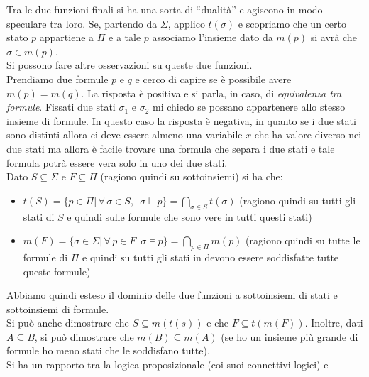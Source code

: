 				      				Tra le due funzioni finali si ha una sorta di ``dualità'' e agiscono in modo
				      				speculare tra loro. Se, partendo da $\Sigma$, applico $t(\sigma)$ e scopriamo
				      				che un certo stato $p$ appartiene a $\Pi$ e a tale $p$ associamo l'insieme dato
				      				da $m(p)$ si avrà che $\sigma\in m(p)$.\\
				      				Si possono fare altre osservazioni su queste due funzioni. \\
				      				Prendiamo due formule $p$ e $q$ e cerco di capire se è possibile avere
				      				$m(p)=m(q)$. La risposta è positiva e si parla, in caso, di \textit{equivalenza
				      					tra formule}. Fissati due stati $\sigma_1$ e $\sigma_2$ mi chiedo se possano
				      				appartenere allo stesso insieme di formule. In questo caso la risposta è
				      				negativa, in quanto se i due stati sono distinti allora ci deve essere almeno
				      				una variabile $x$ che ha valore diverso nei due stati ma allora è facile trovare
				      				una formula che separa i due stati e tale formula potrà essere vera solo in uno
				      				dei due stati.\\
				      				Dato $S\subseteq \Sigma$ e $F\subseteq\Pi$ (ragiono quindi su sottoinsiemi) si
				      				ha che:
				      				\begin{itemize}
				      					\item $t(S)=\{p\in \Pi|\,\forall\,\sigma\in S,\,\,\,\sigma\vDash
				      					      p\}=\bigcap_{\sigma\in S}t(\sigma)$ (ragiono quindi su tutti gli stati di $S$
				      					      e quindi sulle formule che sono vere in tutti questi stati) 
				      					\item $m(F)=\{\sigma\in \Sigma|\,\forall\,p\in F\,\,\,\sigma\vDash
				      					      p\}=\bigcap_{p\in \Pi}m(p)$ (ragiono quindi su tutte le formule di $\Pi$
				      					      e quindi su tutti gli stati in devono essere soddisfatte tutte queste formule) 
				      				\end{itemize}
				      				Abbiamo quindi esteso il dominio delle due funzioni a sottoinsiemi di stati e
				      				sottoinsiemi di formule.\\
				      				Si può anche dimostrare che $S\subseteq m(t(s))$ e che $F\subseteq
				      				t(m(F))$. Inoltre, dati $A\subseteq B$, si può dimostrare che $m(B)\subseteq
				      				m(A)$ (se ho un insieme più grande di formule ho meno stati che le soddisfano
				      				tutte).\\
				      				Si ha un rapporto tra la logica proposizionale (coi suoi connettivi logici) e
